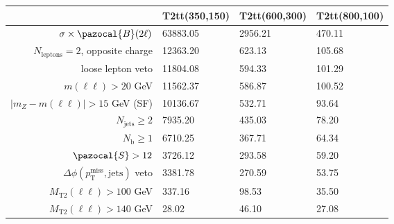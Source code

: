 \documentclass[10pt,oneside]{report}
\begin{document}
\begin{preview}
\begin{tabular}{r|lll}
                                                                    & T2tt(350,150) & T2tt(600,300) & T2tt(800,100) \\\hline
  $\sigma \times \pazocal{B}(2\ell)$                                &      63883.05 &       2956.21 &        470.11 \\
  $N_{\textrm{leptons}}=2$, opposite charge                         &      12363.20 &        623.13 &        105.68 \\
  loose lepton veto                                                 &      11804.08 &        594.33 &        101.29 \\
  $m(\ell\ell)>20$ GeV                                              &      11562.37 &        586.87 &        100.52 \\
  $|m_{Z}-m(\ell\ell)| > 15$ GeV (SF)                               &      10136.67 &        532.71 &         93.64 \\
  $N_{\textrm{jets}}\geq2$                                          &       7935.20 &        435.03 &         78.20 \\
  $N_{\textrm{b}}\geq1$                                             &       6710.25 &        367.71 &         64.34 \\
  $\pazocal{S}>12$                                                  &       3726.12 &        293.58 &         59.20 \\
  $\Delta \phi(p_{\textrm{T}}^{\textrm{miss}}, \textrm{jets})$ veto &       3381.78 &        270.59 &         53.75 \\
  $M_{\textrm{T2}}(\ell\ell)>100$ GeV                               &        337.16 &         98.53 &         35.50 \\
  $M_{\textrm{T2}}(\ell\ell)>140$ GeV                               &         28.02 &         46.10 &         27.08 \\

\end{tabular}
\end{preview}
\end{document}
